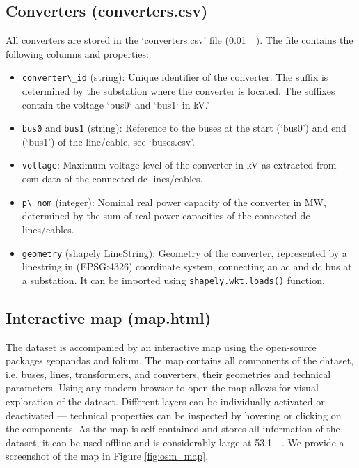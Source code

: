 \documentclass[fleqn,10pt]{wlscirep}
\newcommand{\colorcode}[1]{\colorbox{gray!20}{\lstinline|#1|}}
\begin{document}
\subsection*{Converters (converters.csv)}
All converters are stored in the `converters.csv' file (\SI{0.01}{\mega\byte}). The file contains the following columns and properties:
\begin{itemize}
    \item \colorcode{converter\_id} (string): Unique identifier of the converter. The suffix is determined by the substation where the converter is located. The suffixes contain the voltage `bus0` and `bus1` in \si{\kilo\volt}.'
    \item \colorcode{bus0} and \colorcode{bus1} (string): Reference to the buses at the start (`bus0') and end (`bus1') of the line/cable, see `buses.csv'.
    \item \colorcode{voltage}: Maximum voltage level of the converter in \si{\kilo\volt} as extracted from \acrshort{osm} data of the connected \acrshort{dc} lines/cables. 
    \item \colorcode{p\_nom} (integer): Nominal real power capacity of the converter in \si{\mega\watt}, determined by the sum of real power capacities of the connected \acrshort{dc} lines/cables.
    \item \colorcode{geometry} (shapely LineString): Geometry of the converter, represented by a linestring in (EPSG:4326) coordinate system, connecting an \acrshort{ac} and \acrshort{dc} bus at a substation. It can be imported using \colorcode{shapely.wkt.loads()} function.
\end{itemize}


\subsection*{Interactive map (map.html)}
The dataset is accompanied by an interactive map using the open-source packages geopandas\cite{jordahlGeopandasGeopandasV0812020} and folium. The map contains all components of the dataset, i.e. buses, lines, transformers, and converters, their geometries and technical parameters. Using any modern browser to open the map allows for visual exploration of the dataset. Different layers can be individually activated or deactivated --- technical properties can be inspected by hovering or clicking on the components. As the map is self-contained and stores all information of the dataset, it can be used offline and is considerably large at \SI{53.1}{\mega\byte}. We provide a screenshot of the map in Figure \ref{fig:osm_map}.
\end{document}
